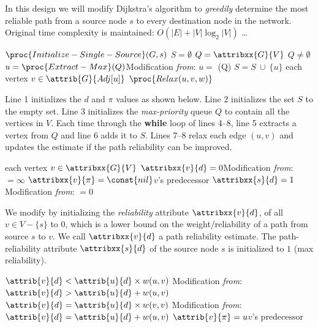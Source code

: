 \begin{homeworkProblem}
\begin{enumerate}[a)]
    In this design we will modify Dijkstra's algorithm to \textit{greedily} 
    determine the most reliable path from a source node $s$ to every destination 
    node in the network. Original time complexity is maintained: 
    $O(|E| + |V|\log_2|V|)$ \ldots
    
    \begin{codebox}
    \li $\proc{Initialize-Single-Source}(G,s)$
    \li $S = \emptyset$
    \li $Q = \attribxx{G}{V}$
    \li \While $Q \neq \emptyset$
   	\li 	\Do
    		    $u = \proc{Extract-Max}(Q)$\>\>\>\>\>\>\Comment Modification
                \textit{from}: $u =$ (Q)
    \li         $S = S\ \cup\ \{u\}$
    \li 	    \For each vertex $v \in \attrib{G}{Adj[u]}$
    \li             \Do
                        $\proc{Relax(u, v, w)}$
                    \End
            \End        
    \end{codebox}
    
    Line 1 initializes the $d$ and $\pi$ values as shown below. Line 2 initializes 
    the set $S$ to the empty set. Line 3 initializes the \textit{max-priority} 
    queue $Q$ to contain all the vertices in $V$. Each time through the 
    \textbf{while} loop of lines 4--8, line 5 extracts a vertex from $Q$ and line 
    6 adds it to $S$. Lines 7--8 relax each edge $(u, v)$ and updates the estimate 
     if the path reliability can be improved.
    
    \begin{codebox}
    \li \For each vertex $v \in \attribxx{G}{V}$
   	\li     \Do
    			$\attribxx{v}{d} = 0$\>\>\>\>\>\>\Comment Modification 
                \textit{from}:  $= \infty$
    \li         $\attribxx{v}{\pi} = \const{nil}$\>\>\>\>\>\>\Comment $v$'s 
    												predecessor
            \End
    \li $\attribxx{s}{d} = 1$\>\>\>\>\>\>\>\Comment Modification \textit{from}: 
     $= 0$
    \end{codebox}
    
    We modify by initializing the \textit{reliability} attribute 
    $\attribxx{v}{d}$, of all $v \in V - \{s\}$ to $0$, which is a lower bound 
    on the weight/reliability of a path from source $s$ to $v$. We call 
    $\attribxx{v}{d}$ a path reliability estimate. The path-reliability attribute 
    $\attribxx{s}{d}$ of the source node $s$ is initialized to $1$ 
    (max reliability). 
    
    \begin{codebox}
    \li \If $\attrib{v}{d} < \attrib{u}{d} \times w(u, v)$\>\>\>\>\>\>\>\Comment 
    		Modification \textit{from}: $\attrib{v}{d} > \attrib{u}{d} + w(u, v)$
    \li 	\Do
    			$\attrib{v}{d} = \attrib{u}{d} \times w(v, v)$\>\>\>\>\>\>\Comment
                Modification \textit{from}: $\attrib{v}{d} = \attrib{u}{d} +
                w(u, v)$
    \li 		$\attrib{v}{\pi} = u$\>\>\>\>\>\>\Comment $v$'s predecessor
    		\End
    \end{codebox}
    

\end{enumerate}
\end{homeworkProblem}
